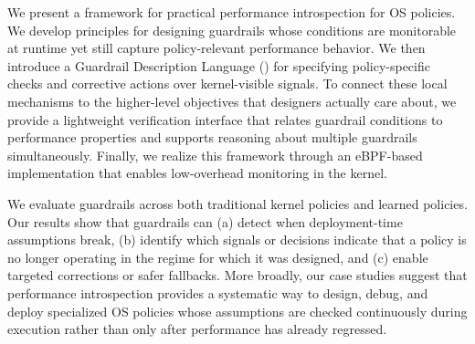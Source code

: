 We present a framework for practical performance introspection for OS policies. We develop principles for designing guardrails whose conditions are monitorable at runtime yet still capture policy-relevant performance behavior. We then introduce a Guardrail Description Language (\lang) for specifying policy-specific checks and corrective actions over kernel-visible signals. To connect these local mechanisms to the higher-level objectives that designers actually care about, we provide a lightweight verification interface that relates guardrail conditions to performance properties and supports reasoning about multiple guardrails simultaneously. Finally, we realize this framework through an eBPF-based implementation that enables low-overhead monitoring in the kernel.

We evaluate guardrails across both traditional kernel policies and learned policies. Our results show that guardrails can (a) detect when deployment-time assumptions break, (b) identify which signals or decisions indicate that a policy is no longer operating in the regime for which it was designed, and (c) enable targeted corrections or safer fallbacks. More broadly, our case studies suggest that performance introspection provides a systematic way to design, debug, and deploy specialized OS policies whose assumptions are checked continuously during execution rather than only after performance has already regressed.